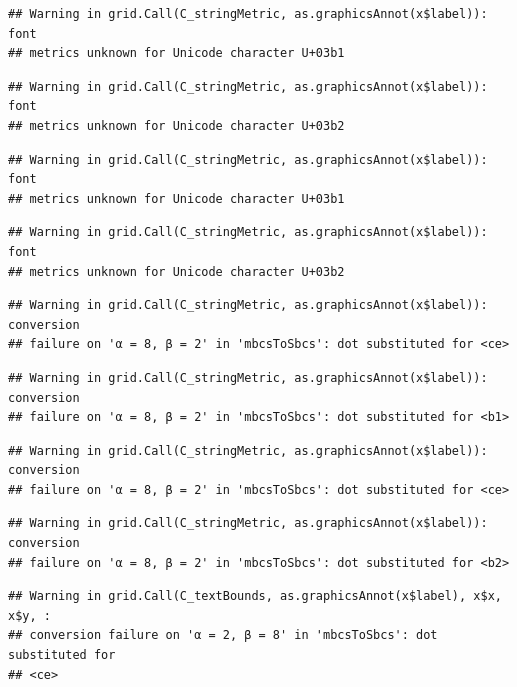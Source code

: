 \documentclass[]{book}
\theoremstyle{definition}
\theoremstyle{definition}
\theoremstyle{definition}
\theoremstyle{remark}
\begin{document}
\begin{verbatim}
## Warning in grid.Call(C_stringMetric, as.graphicsAnnot(x$label)): font
## metrics unknown for Unicode character U+03b1
\end{verbatim}

\begin{verbatim}
## Warning in grid.Call(C_stringMetric, as.graphicsAnnot(x$label)): font
## metrics unknown for Unicode character U+03b2
\end{verbatim}

\begin{verbatim}
## Warning in grid.Call(C_stringMetric, as.graphicsAnnot(x$label)): font
## metrics unknown for Unicode character U+03b1
\end{verbatim}

\begin{verbatim}
## Warning in grid.Call(C_stringMetric, as.graphicsAnnot(x$label)): font
## metrics unknown for Unicode character U+03b2
\end{verbatim}

\begin{verbatim}
## Warning in grid.Call(C_stringMetric, as.graphicsAnnot(x$label)): conversion
## failure on 'α = 8, β = 2' in 'mbcsToSbcs': dot substituted for <ce>
\end{verbatim}

\begin{verbatim}
## Warning in grid.Call(C_stringMetric, as.graphicsAnnot(x$label)): conversion
## failure on 'α = 8, β = 2' in 'mbcsToSbcs': dot substituted for <b1>
\end{verbatim}

\begin{verbatim}
## Warning in grid.Call(C_stringMetric, as.graphicsAnnot(x$label)): conversion
## failure on 'α = 8, β = 2' in 'mbcsToSbcs': dot substituted for <ce>
\end{verbatim}

\begin{verbatim}
## Warning in grid.Call(C_stringMetric, as.graphicsAnnot(x$label)): conversion
## failure on 'α = 8, β = 2' in 'mbcsToSbcs': dot substituted for <b2>
\end{verbatim}

\begin{verbatim}
## Warning in grid.Call(C_textBounds, as.graphicsAnnot(x$label), x$x, x$y, :
## conversion failure on 'α = 2, β = 8' in 'mbcsToSbcs': dot substituted for
## <ce>
\end{verbatim}
\end{document}
